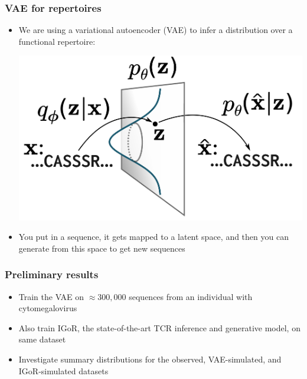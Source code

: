 \documentclass[mathserif,compress]{beamer}
\renewcommand\;{\,}
\begin{document}
\begin{frame}\frametitle{VAE for repertoires}
\begin{itemize}
\item
We are using a variational autoencoder (VAE) to infer a distribution over a functional repertoire:
\bigskip
\begin{center}
\includegraphics[width=0.7\linewidth]{Images/VAE.png}
\end{center}
\bigskip
\item
You put in a sequence, it gets mapped to a latent space, and then you can generate from this space to get new sequences
\end{itemize}
\end{frame}

\begin{frame}\frametitle{Preliminary results}
\begin{itemize}
\item
Train the VAE on $\approx300,000$ sequences from an individual with cytomegalovirus
\bigskip
\item
Also train IGoR, the state-of-the-art TCR inference and generative model, on same dataset
\bigskip
\item
Investigate summary distributions for the observed, VAE-simulated, and IGoR-simulated datasets 
\end{itemize}
\end{frame}
\end{document}
